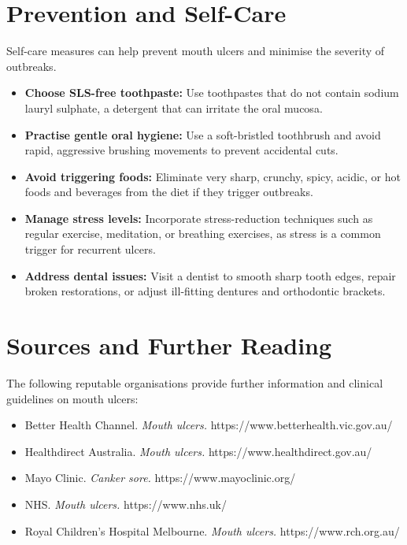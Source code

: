 \section*{Prevention and Self-Care}
Self-care measures can help prevent mouth ulcers and minimise the severity of outbreaks.
\begin{itemize}
    \item \textbf{Choose SLS-free toothpaste:} Use toothpastes that do not contain sodium lauryl sulphate, a detergent that can irritate the oral mucosa.
    \item \textbf{Practise gentle oral hygiene:} Use a soft-bristled toothbrush and avoid rapid, aggressive brushing movements to prevent accidental cuts.
    \item \textbf{Avoid triggering foods:} Eliminate very sharp, crunchy, spicy, acidic, or hot foods and beverages from the diet if they trigger outbreaks.
    \item \textbf{Manage stress levels:} Incorporate stress-reduction techniques such as regular exercise, meditation, or breathing exercises, as stress is a common trigger for recurrent ulcers.
    \item \textbf{Address dental issues:} Visit a dentist to smooth sharp tooth edges, repair broken restorations, or adjust ill-fitting dentures and orthodontic brackets.
\end{itemize}

\section*{Sources and Further Reading}
The following reputable organisations provide further information and clinical guidelines on mouth ulcers:
\begin{itemize}
    \item Better Health Channel. \textit{Mouth ulcers.} https://www.betterhealth.vic.gov.au/
    \item Healthdirect Australia. \textit{Mouth ulcers.} https://www.healthdirect.gov.au/
    \item Mayo Clinic. \textit{Canker sore.} https://www.mayoclinic.org/
    \item NHS. \textit{Mouth ulcers.} https://www.nhs.uk/
    \item Royal Children's Hospital Melbourne. \textit{Mouth ulcers.} https://www.rch.org.au/
\end{itemize}
